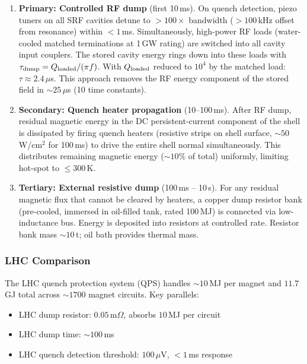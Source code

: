 \documentclass[11pt,a4paper]{article}
\begin{document}
\begin{enumerate}
  \item \textbf{Primary: Controlled RF dump} (first 10\,ms).
    On quench detection, piezo tuners on all SRF cavities detune
    to $> 100 \times$ bandwidth ($> 100$\,kHz offset from resonance)
    within $< 1$\,ms. Simultaneously, high-power RF loads (water-cooled
    matched terminations at 1\,GW rating) are switched into all
    cavity input couplers. The stored cavity energy rings down into
    these loads with $\tau_{\rm dump} = Q_{\rm loaded}/(\pi f)$. With
    $Q_{\rm loaded}$ reduced to $10^4$ by the matched load: $\tau \approx
    2.4\,\mu$s. This approach removes the RF energy component of the
    stored field in $\sim 25\,\mu$s (10 time constants).

  \item \textbf{Secondary: Quench heater propagation} (10--100\,ms).
    After RF dump, residual magnetic energy in the DC persistent-current
    component of the shell is dissipated by firing quench heaters
    (resistive strips on shell surface, $\sim 50$\,W/cm$^2$ for 100\,ms)
    to drive the entire shell normal simultaneously. This distributes
    remaining magnetic energy ($\sim 10\%$ of total) uniformly,
    limiting hot-spot to $\leq 300$\,K.

  \item \textbf{Tertiary: External resistive dump} (100\,ms -- 10\,s).
    For any residual magnetic flux that cannot be cleared by heaters,
    a copper dump resistor bank (pre-cooled, immersed in oil-filled
    tank, rated 100\,MJ) is connected via low-inductance bus.
    Energy is deposited into resistors at controlled rate.
    Resistor bank mass $\sim 10$\,t; oil bath provides thermal mass.
\end{enumerate}

\subsubsection{LHC Comparison}

The LHC quench protection system (QPS) handles $\sim 10$\,MJ per magnet
and $11.7$\,GJ total across $\sim 1700$ magnet circuits. Key parallels:
\begin{itemize}[nosep]
  \item LHC dump resistor: $0.05$\,m$\Omega$, absorbs $10$\,MJ per circuit
  \item LHC dump time: $\sim 100$\,ms
  \item LHC quench detection threshold: $100\,\mu$V, $< 1$\,ms response
\end{itemize}
\end{document}

